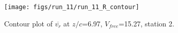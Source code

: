 \begin{figure}[H]
\centering
\texttt{[image: figs/run\_11/run\_11\_R\_contour]}
\caption{Contour plot of $\overline{v_{r}}$ at $z/c$=6.97, $V_{free}$=15.27, station 2.}
\label{fig:run_11_R_contour}
\end{figure}


